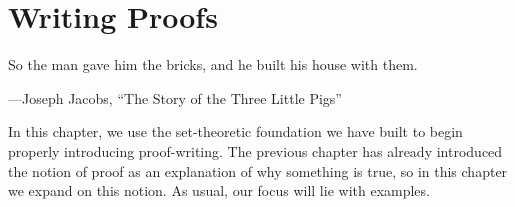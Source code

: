 \documentclass[../notes.tex]{subfiles}
\begin{document}
\chapter{Writing Proofs}
\epigraph{So the man gave him the bricks, and he built his house with them.}
{---Joseph Jacobs, ``The Story of the Three Little Pigs'' \cite{english-fairy-tales}}
In this chapter, we use the set-theoretic foundation we have built to begin properly introducing proof-writing. The previous chapter has already introduced the notion of proof as an explanation of why something is true, so in this chapter we expand on this notion. As usual, our focus will lie with examples.






\end{document}
